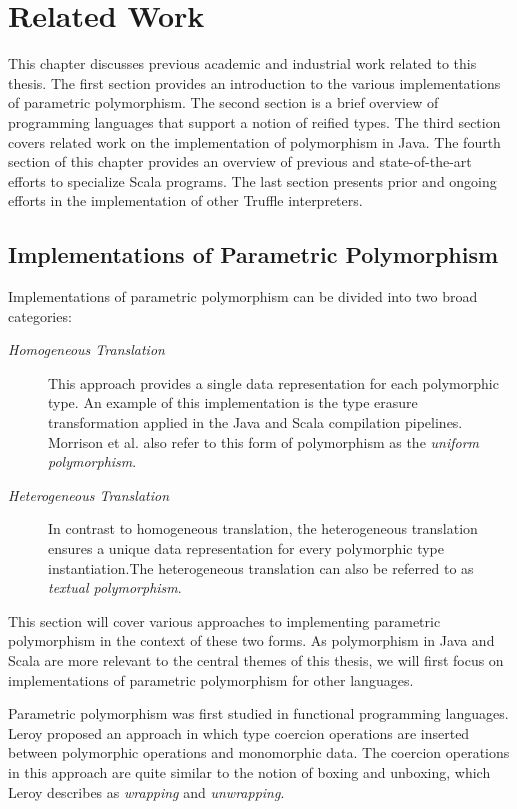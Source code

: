 
\chapter{Related Work}

This chapter discusses previous academic and industrial work related to this thesis. 
The first section provides an introduction to the various implementations of parametric polymorphism.
The second section is a brief overview of programming languages that support a notion of reified types.
The third section covers related work on the implementation of polymorphism in Java.
The fourth section of this chapter provides an overview of previous and state-of-the-art efforts to specialize Scala programs.
The last section presents prior and ongoing efforts in the implementation of other Truffle interpreters.

\section{Implementations of Parametric Polymorphism}

Implementations of parametric polymorphism can be divided into two broad categories\cite{java:odersky-type-params}:

\begin{description}
	\item[\textit{Homogeneous Translation}] 
	This approach provides a single data representation for each polymorphic type. 
	An example of this implementation is the type erasure transformation applied in the Java and Scala compilation pipelines.
	Morrison et al. also refer to this form of polymorphism as the \textit{uniform polymorphism}\cite{napier88:polymorphism}.
	\item[\textit{Heterogeneous Translation}]
	In contrast to homogeneous translation, the heterogeneous translation ensures a unique data representation for every polymorphic type instantiation.The heterogeneous translation can also be referred to as \textit{textual polymorphism}.
\end{description}

This section will cover various approaches to implementing parametric polymorphism in the context of these two forms.
As polymorphism in Java and Scala are more relevant to the central themes of this thesis, we will first focus on implementations of parametric polymorphism for other languages.

Parametric polymorphism was first studied in functional programming languages\cite{ml:parametric-polymorphism,ml:type-inference}.
Leroy proposed an approach in which type coercion operations are inserted between polymorphic operations and monomorphic data. 
The coercion operations in this approach are quite similar to the notion of boxing and unboxing, which Leroy describes as \textit{wrapping} and \textit{unwrapping}.

